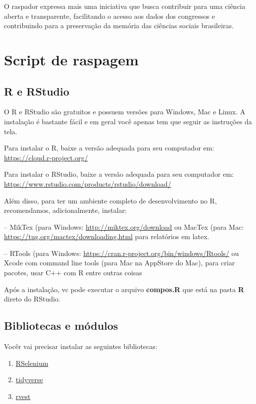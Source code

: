 \documentclass[
]{book}
\providecommand{\tightlist}{%
  \setlength{\itemsep}{0pt}\setlength{\parskip}{0pt}}
\begin{document}
O raspador expressa mais uma iniciativa que busca contribuir para uma ciência aberta e transparente, facilitando o acesso aos dados dos congressos e contribuindo para a preservação da memória das ciências sociais brasileiras.

\hypertarget{script-de-raspagem-1}{%
\section{Script de raspagem}\label{script-de-raspagem-1}}

\hypertarget{r-e-rstudio}{%
\subsection{R e RStudio}\label{r-e-rstudio}}

O R e RStudio são gratuitos e possuem versões para Windows, Mac e Linux. A instalação é bastante fácil e em geral você apenas tem que seguir as instruções da tela.

Para instalar o R, baixe a versão adequada para seu computador em: \url{https://cloud.r-project.org/}

Para instalar o RStudio, baixe a versão adequada para seu computador em: \url{https://www.rstudio.com/products/rstudio/download/}

Além disso, para ter um ambiente completo de desenvolvimento no R, recomendamos, adicionalmente, instalar:

-- MikTex (para Windows: \url{http://miktex.org/download} ou MacTex (para Mac: \url{https://tug.org/mactex/downloading.html} para relatórios em latex.

-- RTools (para Windows: \url{https://cran.r-project.org/bin/windows/Rtools/} ou Xcode com command line tools (para Mac na AppStore do Mac), para criar pacotes, usar C++ com R entre outras coisas

Após a instalação, vc pode executar o arquivo \textbf{compos.R} que está na pasta \textbf{R} direto do RStudio.

\hypertarget{bibliotecas-e-muxf3dulos}{%
\subsection{Bibliotecas e módulos}\label{bibliotecas-e-muxf3dulos}}

Vocêr vai precisar instalar as seguintes bibliotecas:

\begin{enumerate}
\def\labelenumi{\arabic{enumi}.}
\tightlist
\item
  \href{https://cran.r-project.org/web/packages/RSelenium/RSelenium.pdf}{RSelenium}
\item
  \href{https://www.tidyverse.org/}{tidyverse}
\item
  \href{https://cran.r-project.org/web/packages/rvest/rvest.pdf}{rvest}
\end{enumerate}
\end{document}
